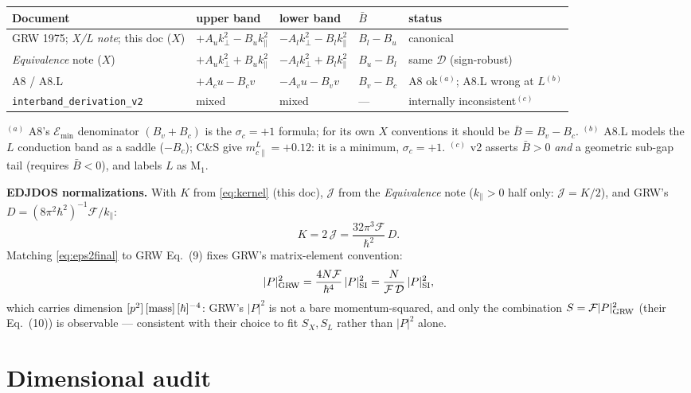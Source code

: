 \documentclass[11pt,a4paper]{article}
\numberwithin{equation}{section}
\newcommand{\cD}{\mathcal{D}}
\newcommand{\cF}{\mathcal{F}}
\newcommand{\Bb}{\bar{B}}
\newcommand{\kperp}{k_{\perp}}
\newcommand{\kpar}{k_{\parallel}}
\begin{document}
\begin{center}
\footnotesize
\setlength{\tabcolsep}{4pt}
\begin{tabular}{lllll}
\toprule
Document & upper band & lower band & $\Bb$ & status\\
\midrule
GRW 1975; \emph{X/L note}; this doc ($X$) &
$+A_u\kperp^2-B_u\kpar^2$ & $-A_l\kperp^2-B_l\kpar^2$ &
$B_l-B_u$ & canonical\\
\emph{Equivalence} note ($X$) &
$+A_u\kperp^2+B_u\kpar^2$ & $-A_l\kperp^2+B_l\kpar^2$ &
$B_u-B_l$ & same $\cD$ (sign-robust)\\
A8 / A8.L &
$+A_c u-B_c v$ & $-A_v u-B_v v$ & $B_v-B_c$ &
A8 ok$^{(a)}$; A8.L wrong at $L$$^{(b)}$\\
\texttt{interband\_derivation\_v2} & mixed & mixed & --- &
internally inconsistent$^{(c)}$\\
\bottomrule
\end{tabular}
\end{center}
{\footnotesize
$^{(a)}$ A8's $\mathcal{E}_{\min}$ denominator $(B_v{+}B_c)$ is the
$\sigma_c{=}{+}1$ formula; for its own $X$ conventions it should be
$\Bb=B_v{-}B_c$.\quad
$^{(b)}$ A8.L models the $L$ conduction band as a saddle ($-B_c$);
C\&S give $m_{c\parallel}^L=+0.12$: it is a minimum, $\sigma_c=+1$.\quad
$^{(c)}$ v2 asserts $\Bb>0$ \emph{and} a geometric sub-gap tail
(requires $\Bb<0$), and labels $L$ as M$_1$.}

\medskip
\noindent\textbf{EDJDOS normalizations.}  With
$K$ from \eqref{eq:kernel} (this doc), $\mathcal J$ from the
\emph{Equivalence} note ($\kpar>0$ half only: $\mathcal J=K/2$), and
GRW's $D=(8\pi^2\hbar^2)^{-1}\cF/\kpar$:
\begin{equation}
K=2\,\mathcal J=\frac{32\pi^3\cF}{\hbar^2}\,D .
\end{equation}
Matching \eqref{eq:eps2final} to GRW Eq.~(9) fixes GRW's
matrix-element convention:
\begin{equation}
|P|^2_{\rm GRW}=\frac{4N\cF}{\hbar^4}\,|P|^2_{\rm SI}
=\frac{N}{\cF\,\cD}\,|P|^2_{\rm SI},
\end{equation}
which carries dimension $[p^2]\,[{\rm mass}]\,[\hbar]^{-4}$: GRW's
$|P|^2$ is not a bare momentum-squared, and only the combination
$S=\cF|P|^2_{\rm GRW}$ (their Eq.~(10)) is observable --- consistent
with their choice to fit $S_X,S_L$ rather than $|P|^2$ alone.

\section{Dimensional audit}\label{app:dim}
\end{document}
